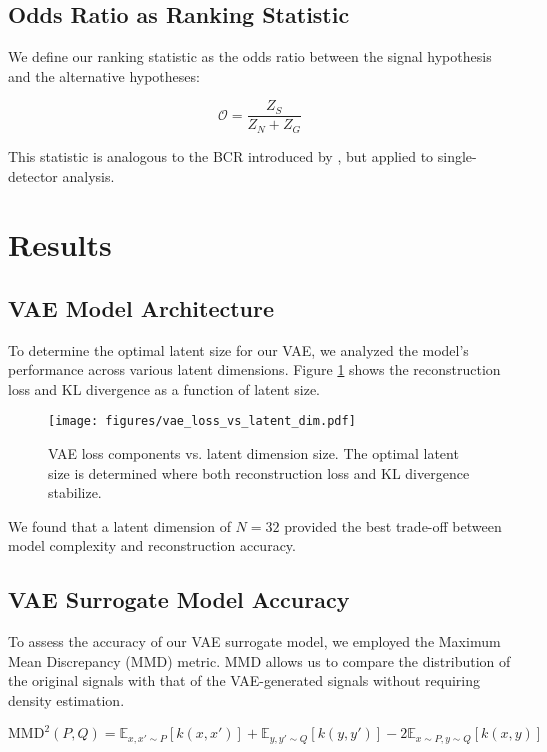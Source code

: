 \documentclass[twocolumn]{aastex631}
\begin{document}
\subsection{Odds Ratio as Ranking Statistic}
We define our ranking statistic as the odds ratio between the signal hypothesis and the alternative hypotheses:

\begin{equation}
\mathcal{O} = \frac{Z_S}{Z_N + Z_G}    
\end{equation}

This statistic is analogous to the BCR introduced by \citet{Isi:2018:PhRvD}, but applied to single-detector analysis.

\section{Results}


\subsection{VAE Model Architecture}
To determine the optimal latent size for our VAE, we analyzed the model's performance across various latent dimensions. 
Figure \ref{fig:vae_loss} shows the reconstruction loss and KL divergence as a function of latent size.

\begin{figure}[h]
    \centering
    \texttt{[image: figures/vae\_loss\_vs\_latent\_dim.pdf]}
    \caption{VAE loss components vs. latent dimension size. The optimal latent size is determined where both reconstruction loss and KL divergence stabilize.}
    \label{fig:vae_loss}
\end{figure}

We found that a latent dimension of $N=32$ provided the best trade-off between model complexity and reconstruction accuracy.

\subsection{VAE Surrogate Model Accuracy}
To assess the accuracy of our VAE surrogate model, we employed the Maximum Mean Discrepancy (MMD) metric. 
MMD allows us to compare the distribution of the original signals with that of the VAE-generated signals without requiring density estimation.

\begin{equation*}
    \text{MMD}^2(P,Q) = \mathbb{E}_{x,x'\sim P}[k(x,x')] + \mathbb{E}_{y,y'\sim Q}[k(y,y')] - 2\mathbb{E}_{x\sim P,y\sim Q}[k(x,y)]
\end{equation*}
\end{document}

